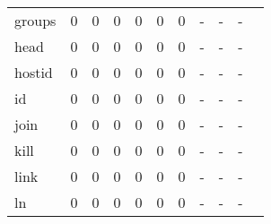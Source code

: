 \begin{longtable}{lp{1.10cm}p{1.10cm}p{1.10cm}p{1.10cm}p{1.10cm}p{1.10cm}p{1.10cm}p{1.10cm}p{1.10cm}p{1.10cm}}
groups    &                      0 &                                  0 &                                 0 &                                0 &                                 0 &                               0 &                              - &                                     - &                                   - \\
head      &                      0 &                                  0 &                                 0 &                                0 &                                 0 &                               0 &                              - &                                     - &                                   - \\
hostid    &                      0 &                                  0 &                                 0 &                                0 &                                 0 &                               0 &                              - &                                     - &                                   - \\
id        &                      0 &                                  0 &                                 0 &                                0 &                                 0 &                               0 &                              - &                                     - &                                   - \\
join      &                      0 &                                  0 &                                 0 &                                0 &                                 0 &                               0 &                              - &                                     - &                                   - \\
kill      &                      0 &                                  0 &                                 0 &                                0 &                                 0 &                               0 &                              - &                                     - &                                   - \\
link      &                      0 &                                  0 &                                 0 &                                0 &                                 0 &                               0 &                              - &                                     - &                                   - \\
ln        &                      0 &                                  0 &                                 0 &                                0 &                                 0 &                               0 &                              - &                                     - &                                   - \\

\end{longtable}
